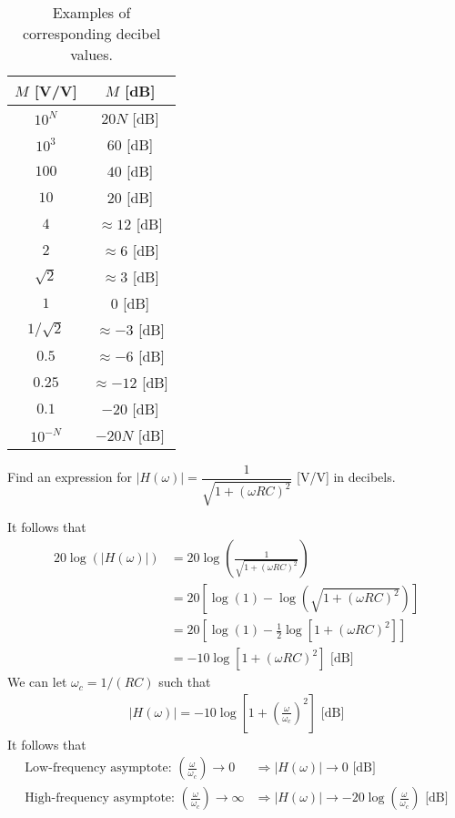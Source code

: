 \documentclass{report}
\begin{document}
\begin{table}[!hbt]
    \centering
    \caption{Examples of corresponding decibel values.}
    \label{decibels}
    \begin{tabular}{|c|c|}
        $M$ [V/V] & $M$ [dB] \\
        \hline
        $10^N$ & $20N$ [dB] \\
        $10^3$ & $60$ [dB] \\
        $100$ & $40$ [dB] \\
        $10$ & $20$ [dB] \\
        $4$ & $\approx 12$ [dB] \\
        $2$ & $\approx 6$ [dB] \\
        $\sqrt{2}$ & $\approx 3$ [dB] \\
        $1$ & $0$ [dB] \\
        $1/\sqrt{2}$ & $\approx -3$ [dB] \\
        $0.5$ & $\approx -6$ [dB] \\
        $0.25$ & $\approx -12$ [dB] \\
        $0.1$ & $-20$ [dB] \\
        $10^{-N}$ & $-20N$ [dB] \\ 
    \end{tabular}
\end{table}

\begin{example}
    Find an expression for $|H(\omega)| = \dfrac{1}{\sqrt{1+(\omega RC)^2}}$ [V/V] in decibels.
\end{example}
\begin{solution}
    It follows that 
    \begin{align*}
        20\log(|H(\omega)|) &= 20\log\left(\frac{1}{\sqrt{1+(\omega RC)^2}}\right) \\
        &= 20\left[\log(1) - \log\left(\sqrt{1+(\omega RC)^2}\right)\right] \\
        &= 20\left[\log(1) - \frac{1}{2}\log\left[1+(\omega RC)^2\right]\right] \\
        &= -10\log\left[1+(\omega RC)^2\right] \text{ [dB]}
    \end{align*}
    We can let $\omega_c = 1/(RC)$ such that
    \begin{align*}
        |H(\omega)| = -10\log\left[1+\left(\frac{\omega}{\omega_c}\right)^2\right] \text{ [dB]}
    \end{align*}
    It follows that 
    \begin{align*}
        \text{Low-frequency asymptote: } \left(\frac{\omega}{\omega_c}\right)\rightarrow 0 &\Longrightarrow |H(\omega)|\rightarrow 0 \text{ [dB]} \\
        \text{High-frequency asymptote: } \left(\frac{\omega}{\omega_c}\right)\rightarrow \infty &\Longrightarrow |H(\omega)|\rightarrow -20\log\left(\frac{\omega}{\omega_c}\right) \text{ [dB]}
    \end{align*}
\end{solution}
\end{document}
